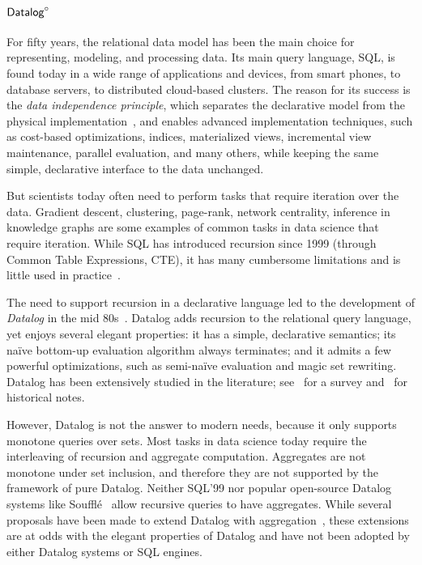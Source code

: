 \chapter{\texorpdfstring{$\text{\sf Datalog}^\circ$}{Datalogo}}
\label{chap:datalogo}

For fifty years, the relational data model has been the main choice for
representing, modeling, and processing data.  Its main query
language, SQL, is found today in a wide range of applications and
devices, from smart phones, to database servers, to distributed
cloud-based clusters.  The reason for its success is the {\em data
  independence principle}, which separates the declarative model from
the physical implementation~\cite{DBLP:journals/cacm/Codd70}, and
enables advanced implementation techniques, such as cost-based
optimizations, indices, materialized views, incremental view
maintenance, parallel evaluation, and many others, while keeping the
same simple, declarative interface to the data unchanged.

But scientists today often need to perform tasks that require
iteration over the data.
Gradient descent, clustering, page-rank, network centrality, inference
in knowledge graphs are some examples of common tasks in data science
that require iteration.  While SQL has introduced recursion since 1999
(through Common Table Expressions, CTE), it has many cumbersome
limitations and is little used in practice~\cite{frankmcsherry-2022}.

The need to support recursion in a declarative language led to the
development of {\em Datalog} in the mid 80s~\cite{DBLP:conf/pods/Vianu21}.
Datalog adds recursion to the relational query language, yet enjoys several elegant
properties: it has a simple, declarative semantics; its na\"ive
bottom-up evaluation algorithm always terminates; and it admits a few
powerful optimizations, such as semi-na\"ive evaluation and magic set
rewriting.  Datalog has been extensively studied in the literature;
see~\cite{DBLP:journals/ftdb/GreenHLZ13} for a survey
and~\cite{DBLP:books/mc/18/MaierTKW18,DBLP:conf/pods/Vianu21} for historical notes.

However, Datalog is not the answer to modern needs, because it only
supports monotone queries over sets.  Most tasks in data science today
require the interleaving of recursion and aggregate computation.
Aggregates are not monotone under set inclusion, and therefore they
are not supported by the framework of pure Datalog.  Neither SQL'99
nor popular open-source Datalog systems like
Souffl\'e~\cite{DBLP:conf/cav/JordanSS16} allow recursive queries to
have aggregates.  While several proposals have been made to extend
Datalog with
aggregation~\cite{DBLP:conf/pods/GangulyGZ91,DBLP:conf/pods/RossS92,DBLP:journals/jcss/GangulyGZ95,DBLP:journals/vldb/MazuranSZ13,DBLP:conf/icde/ShkapskyYZ15,DBLP:conf/sigmod/ShkapskyYICCZ16,DBLP:conf/amw/ZanioloYDI16,DBLP:journals/tplp/ZanioloYDSCI17,DBLP:conf/amw/ZanioloYIDSC18,DBLP:journals/tplp/CondieDISYZ18,DBLP:conf/sigmod/0001WMSYDZ19,DBLP:journals/corr/abs-1910-08888,DBLP:journals/corr/abs-1909-08249,DBLP:journals/debu/ZanioloD0LL021},
these extensions are at odds with the elegant properties of Datalog
and have not been adopted by either Datalog systems or SQL engines.

